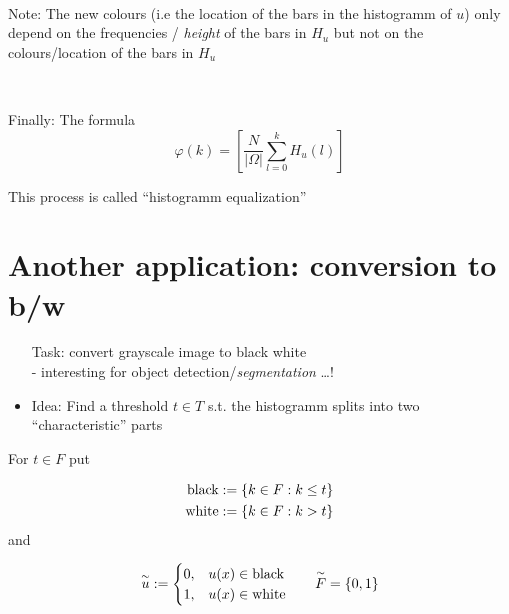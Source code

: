 ~\par
\todoLayout[Layout S.12 u]
Note: The new colours (i.e the location of the bars 
in the histogramm of $u$) only depend on the
frequencies / \emph{height} of the bars in $H_u$
but not on the colours/location of the bars in $H_u$

~\par
Finally: The formula
	$$ \varphi(k) = \left[ \frac {N} {|\Omega|} 
	\sum_{l=0}^{k} H_u (l) \right]$$

This process is called \enquote{histogramm equalization}


\section{Another application: conversion to b/w}	

\begin{itemize}[]
  \item [Task:] convert grayscale image to black white\\
	- interesting for object detection/\emph{segmentation} \dots !
	\item Idea: Find a threshold $t\in T$ s.t. the histogramm splits
		into two \enquote{characteristic} parts
\end{itemize}

\begin{minipage}{\linewidth}
 	\tikzpictureQTWELVEONE 
\end{minipage}

For $t\in F$ put 

$$\begin{aligned}
	\text{black} &	:= \left\{k\in F: k \le t\right\} \\
	\text{white} & 	:= \left\{k\in F: k > t\right\} \\
\end{aligned}$$
and 


$$ \begin{aligned}
		\overset{\sim}{u} & :=		
			\begin{cases}
				0, & u(x) \in \text{black} \\
				1, & u(x) \in \text{white}
			\end{cases}
			& \quad \overset{\sim}{F} = \left\{0,1\right\} 
\end{aligned} $$

